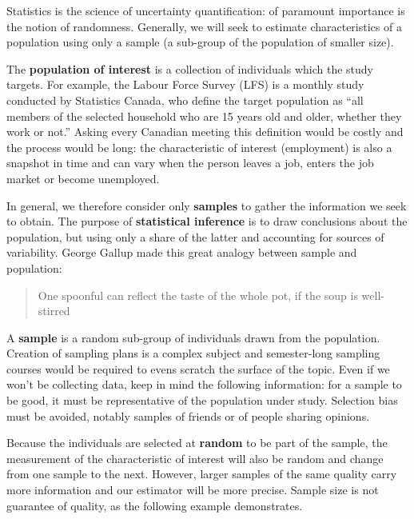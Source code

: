 \documentclass[
  11pt,
  letterpaper,
]{book}
\theoremstyle{definition}
\theoremstyle{definition}
\theoremstyle{definition}
\theoremstyle{remark}
\begin{document}
Statistics is the science of uncertainty quantification: of paramount importance is the notion of randomness. Generally, we will seek to estimate characteristics of a population using only a sample (a sub-group of the population of smaller size).

The \textbf{population of interest} is a collection of individuals which the study targets. For example, the Labour Force Survey (LFS) is a monthly study conducted by Statistics Canada, who define the target population as ``all members of the selected household who are 15 years old and older, whether they work or not.'' Asking every Canadian meeting this definition would be costly and the process would be long: the characteristic of interest (employment) is also a snapshot in time and can vary when the person leaves a job, enters the job market or become unemployed.

In general, we therefore consider only \textbf{samples} to gather the information we seek to obtain. The purpose of \textbf{statistical inference} is to draw conclusions about the population, but using only a share of the latter and accounting for sources of variability. George Gallup made this great analogy between sample and population:

\begin{quote}
One spoonful can reflect the taste of the whole pot, if the soup is well-stirred
\end{quote}

A \textbf{sample} is a random sub-group of individuals drawn from the population. Creation of sampling plans is a complex subject and semester-long sampling courses would be required to evens scratch the surface of the topic. Even if we won't be collecting data, keep in mind the following information: for a sample to be good, it must be representative of the population under study. Selection bias must be avoided, notably samples of friends or of people sharing opinions.

Because the individuals are selected at \textbf{random} to be part of the sample, the measurement of the characteristic of interest will also be random and change from one sample to the next. However, larger samples of the same quality carry more information and our estimator will be more precise. Sample size is not guarantee of quality, as the following example demonstrates.
\end{document}

